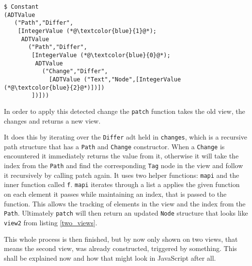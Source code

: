 

\begin{lstlisting}[columns=fullflexible, label={non-reduced-differ}, language=Other, caption=Differ path detecting change on \texttt{Text} node]
$ Constant
(ADTValue
   ("Path","Differ",
    [IntegerValue (*@\textcolor{blue}{1}@*);
     ADTValue
       ("Path","Differ",
        [IntegerValue (*@\textcolor{blue}{0}@*);
         ADTValue
           ("Change","Differ",
             [ADTValue ("Text","Node",[IntegerValue (*@\textcolor{blue}{2}@*)])])
        ])]))
\end{lstlisting}

In order to apply this detected change the \texttt{patch} function takes the old view, the changes and returns a new view.



It does this by iterating over the \texttt{Differ} \gls{adt} held in \texttt{changes}, which is a recursive path structure that has a \texttt{Path} and \texttt{Change} constructor. When a \texttt{Change} is encountered it immediately returns the value from it, otherwise it will take the index from the \texttt{Path} and find the corresponding \texttt{Tag} node in the view and follow it recursively by calling patch again.
It uses two helper functions: \texttt{mapi} and the inner function called \texttt{f}. \texttt{mapi} iterates through a list a applies the given function on each element it passes while maintaining an index, that is passed to the function. This allows the tracking of elements in the view and the index from the \texttt{Path}.
Ultimately \texttt{patch} will then return an updated \texttt{Node} structure that looks like \texttt{view2} from listing \ref{two_views}.

This whole process is then finished, but by now only shown on two views, that means the second view, was already constructed, triggered by something. This shall be explained now and how that might look in JavaScript after all.




